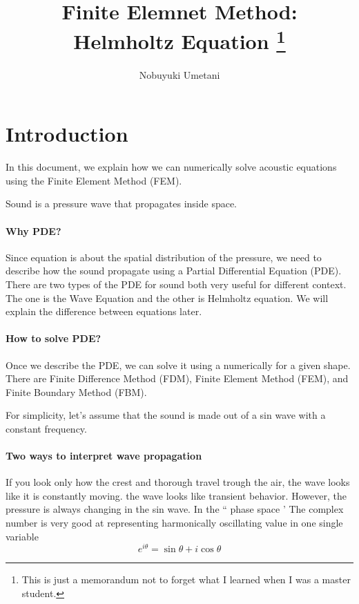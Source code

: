 




\title{Finite Elemnet Method:\\Helmholtz Equation \footnote{This is just a memorandum not to forget what I learned when I was a master student.}}

\author{Nobuyuki Umetani}



\maketitle
\tableofcontents


\section{Introduction}
In this document, we explain how we can numerically solve acoustic equations using the Finite Element Method (FEM).

Sound is a pressure wave that propagates inside space.




\paragraph{Why PDE?}
Since equation is about the spatial distribution of the pressure, we need to describe how the sound propagate using a Partial Differential Equation (PDE).
%
There are two types of the PDE for sound both very useful for different context.
%
The one is the Wave Equation and the other is Helmholtz equation.
%
We will explain the difference between equations later.
%


\paragraph{How to solve PDE?}
Once we describe the PDE, we can solve it using a numerically for a given shape.
%
There are Finite Difference Method (FDM), Finite Element Method (FEM), and Finite Boundary Method (FBM).
%



For simplicity, let's assume that the sound is made out of a sin wave with a constant frequency.


\paragraph{Two ways to interpret wave propagation}
If you look only how the crest and thorough travel trough the air, the wave looks like it is constantly moving.
the wave looks like transient behavior.
%
However, the pressure is always changing in the sin wave.
%
In the `` phase space '
%
The complex number is very good at representing harmonically oscillating value in one single variable
%
\begin{equation}
e^{i \theta} = \sin \theta + i \cos \theta
\end{equation}



